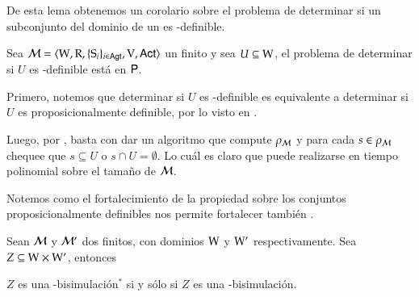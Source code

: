 De esta lema obtenemos un corolario sobre el problema de determinar si un subconjunto del dominio de un \ults es \KHilogic-definible.

\begin{corolario}
    Sea $\mathcal{M}=\langle \mathrm{W},\mathrm{R},\{ \mathrm{S}_i \}_{i \in {\rm \sf Agt}},\mathrm{V},{\rm \sf Act} \rangle$ un \ults finito y sea $U \subseteq \mathrm{W}$, el problema de determinar si $U$ es 
    \KHilogic-definible está en $\rm\textsf{P}$.
\end{corolario}

\begin{demostracion}

    Primero, notemos que determinar si $U$ es \KHilogic-definible es equivalente a determinar si $U$ es proposicionalmente definible, por lo visto en 
    .

    Luego, por , basta con dar un algoritmo que compute $\rho_{\mathcal{M}}$ y para cada $s \in \rho_{\mathcal{M}}$ 
    chequee que $s \subseteq U$ o $s \cap U = \emptyset$. Lo cuál es claro que puede realizarse en tiempo polinomial sobre el tamaño de $\mathcal{M}$.
\end{demostracion}

Notemos como el fortalecimiento de la propiedad sobre los conjuntos proposicionalmente definibles nos permite fortalecer también .

\begin{lema}\label{lema:old-implies-new-finite}
    Sean $\mathcal{M}$ y $\mathcal{M}'$ dos \ultss finitos, con dominios $\mathrm{W}$ y $\mathrm{W}'$ respectivamente. Sea $Z \subseteq \mathrm{W} \times \mathrm{W}'$, entonces 
    \begin{center}
        $Z$ es una \KHilogic-bisimulación$^*$ si y sólo si $Z$ es una \KHilogic-bisimulación.
    \end{center}
\end{lema}

